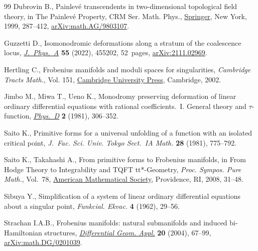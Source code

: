 \begin{thebibliography}{99}
Dubrovin B., Painlev\'e transcendents in two-dimensional topological field
 theory, in The {P}ainlev\'e {P}roperty, CRM Ser. Math. Phys., \href{https://doi.org/10.1007/978-1-4612-1532-5_6}{Springer}, New
 York, 1999, 287--412, \href{https://arxiv.org/abs/math.AG/9803107}{arXiv:math.AG/9803107}.

Guzzetti D., Isomonodromic deformations along a stratum of the coalescence
 locus, \href{https://doi.org/10.1088/1751-8121/ac9ba8}{\textit{J.~Phys.~A}} \textbf{55} (2022), 455202, 52~pages,
 \href{https://arxiv.org/abs/2111.02969}{arXiv:2111.02969}.

Hertling C., Frobenius manifolds and moduli spaces for singularities,
 \textit{Cambridge Tracts Math.}, Vol. 151, \href{https://doi.org/10.1017/CBO9780511543104}{Cambridge University Press},
 Cambridge, 2002.

Jimbo M., Miwa T., Ueno K., Monodromy preserving deformation of linear ordinary
 differential equations with rational coefficients.~{I}. {G}eneral theory and
 {$\tau $}-function, \href{https://doi.org/10.1016/0167-2789(81)90013-0}{\textit{Phys.~D}} \textbf{2} (1981), 306--352.

Saito K., Primitive forms for a universal unfolding of a function with an
 isolated critical point, \textit{J.~Fac. Sci. Univ. Tokyo Sect.~IA Math.}
 \textbf{28} (1981), 775--792.

Saito K., Takahashi A., From primitive forms to {F}robenius manifolds, in From
 {H}odge {T}heory to {I}ntegrability and {TQFT} tt*-{G}eometry, \textit{Proc.
 Sympos. Pure Math.}, Vol.~78, \href{https://doi.org/10.1090/pspum/078/2483747}{American Mathematical Society}, Providence, RI,
 2008, 31--48.

Sibuya Y., Simplification of a system of linear ordinary differential equations
 about a singular point, \textit{Funkcial. Ekvac.} \textbf{4} (1962), 29--56.

Strachan I.A.B., Frobenius manifolds: natural submanifolds and induced
 bi-{H}amiltonian structures, \href{https://doi.org/10.1016/j.difgeo.2003.10.001}{\textit{Differential Geom. Appl.}} \textbf{20}
 (2004), 67--99, \href{https://arxiv.org/abs/math.DG/0201039}{arXiv:math.DG/0201039}.

\end{thebibliography}
